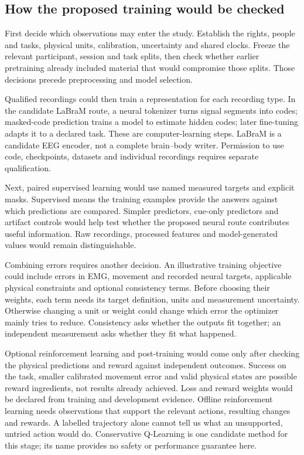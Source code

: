 \subsection{How the proposed training would be checked}

First decide which observations may enter the study. Establish the rights,
people and tasks, physical units, calibration, uncertainty and shared clocks.
Freeze the relevant participant, session and task splits, then check whether
earlier pretraining already included material that would compromise those
splits. Those decisions precede preprocessing and model selection.

Qualified recordings could then train a representation for each recording
type. In the candidate LaBraM route, a neural tokenizer turns signal segments
into codes; masked-code prediction trains a model to estimate hidden codes;
later fine-tuning adapts it to a declared task. These are computer-learning
steps. LaBraM is a candidate EEG encoder, not a complete brain--body writer.
Permission to use code, checkpoints, datasets and individual recordings
requires separate qualification.

Next, paired supervised learning would use named measured targets and
explicit masks. Supervised means the training examples provide the answers
against which predictions are compared. Simpler predictors, cue-only
predictors and artifact controls would help test whether the proposed neural
route contributes useful information. Raw recordings, processed features and
model-generated values would remain distinguishable.

Combining errors requires another decision. An illustrative training
objective could include errors in EMG, movement and recorded neural targets,
applicable physical constraints and optional consistency terms. Before
choosing their weights, each term needs its target definition, units and
measurement uncertainty. Otherwise changing a unit or weight could change
which error the optimizer mainly tries to reduce. Consistency asks whether
the outputs fit together; an independent measurement asks whether they fit
what happened.

Optional reinforcement learning and post-training would come only after
checking the physical predictions and reward against independent outcomes.
Success on the task, smaller calibrated movement error and valid physical
states are possible reward ingredients, not results already achieved.
Loss and reward weights would be declared from training and development
evidence. Offline reinforcement learning needs observations that support
the relevant actions, resulting changes and rewards. A labelled trajectory
alone cannot tell us what an unsupported, untried action would do.
Conservative Q-Learning is one candidate method for this stage; its name
provides no safety or performance guarantee here.

